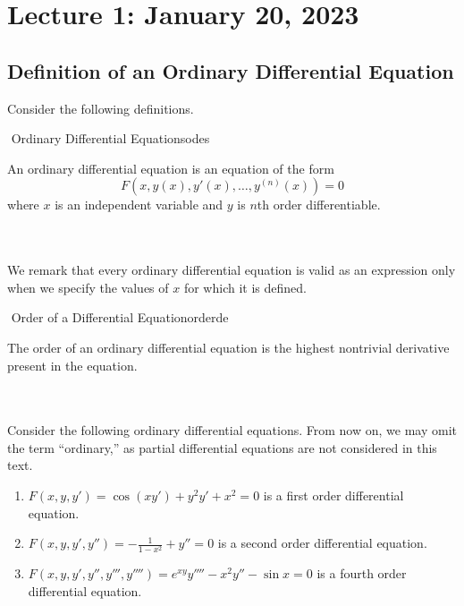 \section{Lecture 1: January 20, 2023}

    \subsection{Definition of an Ordinary Differential Equation}

        Consider the following definitions.
        \begin{definition}{\Stop\,\,Ordinary Differential Equations}{odes}

            An ordinary differential equation is an equation of the form
            \begin{equation*}
                F(x,y(x),y'(x),\ldots,y^{(n)}(x))=0
            \end{equation*}
            where \(x\) is an independent variable and \(y\) is \(n\)th order differentiable.
            
        \end{definition}
        \vphantom
        \\
        \\
        We remark that every ordinary differential equation is valid as an expression only when we specify the values of \(x\) for which it is defined.
        \begin{definition}{\Stop\,\,Order of a Differential Equation}{orderde}

            The order of an ordinary differential equation is the highest nontrivial derivative present in the equation.
            
        \end{definition}
        \vphantom
        \\
        \\
        Consider the following ordinary differential equations. From now on, we may omit the term ``ordinary,'' as partial differential equations are not considered in this text.
        \begin{enumerate}
            \item \(F(x,y,y')=\cos(xy')+y^2y'+x^2=0\) is a first order differential equation.
            \item \(F(x,y,y',y'')=-\frac{1}{1-x^2}+y''=0\) is a second order differential equation.
            \item \(F(x,y,y',y'',y''',y'''')=e^{xy}y''''-x^2y''-\sin x=0\) is a fourth order differential equation.
        \end{enumerate}
        \pagebreak
        
